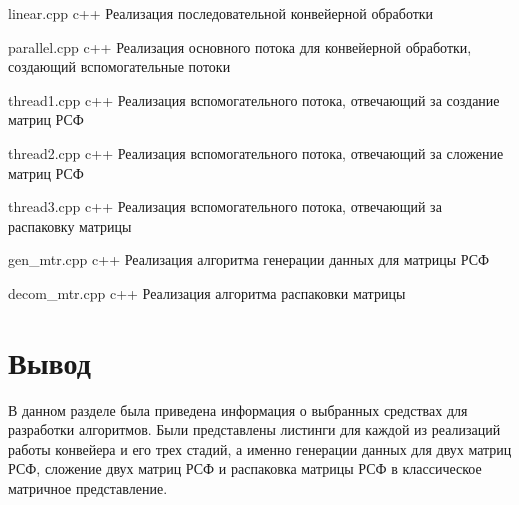 \newpage 

{linear.cpp}
{c++}
{Реализация последовательной конвейерной обработки}

\newpage 

{parallel.cpp}
{c++}
{Реализация основного потока для конвейерной обработки, создающий вспомогательные потоки}

\newpage 

{thread1.cpp}
{c++}
{Реализация вспомогательного потока, отвечающий за создание матриц РСФ}

\newpage 

{thread2.cpp}
{c++}
{Реализация вспомогательного потока, отвечающий за сложение матриц РСФ}

\newpage 

{thread3.cpp}
{c++}
{Реализация вспомогательного потока, отвечающий за распаковку матрицы}

\newpage 

{gen_mtr.cpp}
{c++}
{Реализация алгоритма генерации данных для матрицы РСФ}

\newpage 

{decom_mtr.cpp}
{c++}
{Реализация алгоритма распаковки матрицы}

\section*{Вывод}
В данном разделе была приведена информация о выбранных средствах для разработки алгоритмов. 
Были представлены листинги для каждой из реализаций работы конвейера и его трех стадий, а именно генерации данных для двух матриц РСФ, сложение двух матриц РСФ и распаковка матрицы РСФ в классическое матричное представление.